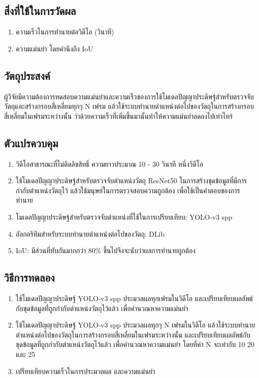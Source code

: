 \subsection*{สิ่งที่ใช้ในการวัดผล}
	\begin{enumerate}
		\setlength\itemsep{-0.25em}
		\item ความเร็วในการทำนายต่อวิดีโอ (วินาที)
		\item ความแม่นยำ โดยคำนึงถึง IoU
	\end{enumerate}
\subsection*{วัตถุประสงค์}
ผู้วิจัยมีความต้องการทดสอบความแม่นยำและความเร็วของการใช้โมเดลปัญญาประดิษฐ์สำหรับตรวจจับวัตถุและสร้างกรอบสี่เหลี่ยมทุกๆ N เฟรม 
แล้วใช้ระบบทำนายตำแหน่งต่อไปของวัตถุในการสร้างกรอบสี่เหลี่ยมในเฟรมระหว่างนั้น ว่าด้วยความเร็วที่เพิ่มขึ้นมานั้นทำให้ความแม่นยำลดลงไปเท่าไหร่
\subsection*{ตัวแปรควบคุม}
	\begin{enumerate}
		\setlength\itemsep{-0.25em}
		\item วิดีโอสาธารณะที่ไม่ติดลิขสิทธิ์ ความยาวประมาณ 10 - 30 วินาที หนึ่งวิดีโอ
		\item ใช้โมเดลปัญญาประดิษฐ์สำหรับตรวจจับตำแหน่งวัตถุ ResNet50 ในการสร้างชุดข้อมูลที่มีการกำกับตำแหน่งวัตถุไว้ แล้วใช้มนุษย์ในการตรวจสอบความถูกต้อง
		เพื่อใช้เป็นคำตอบของการทำนาย
		\item โมเดลปัญญาประดิษฐ์สำหรับตรวจจับตำแหน่งที่ใช้ในการเปรียบเทียบ: YOLO-v3 spp
		\item อัลกอริทึมสำหรับระบบทำนายตำแหน่งต่อไปของวัตถุ: DLib
		\item IoU: มีส่วนที่ทับกันมากกว่า 80\% ขึ้นไปจึงจะนับว่าผลการทำนายถูกต้อง
	\end{enumerate}
\subsection*{วิธีการทดลอง}
	\begin{enumerate}
		\setlength\itemsep{-0.25em}
		\item ใช้โมเดลปัญญาประดิษฐ์ YOLO-v3 spp ประมวลผลทุกเฟรมในวิดีโอ และเปรียบเทียบผลลัพธ์กับชุดข้อมูลที่ถูกกำกับตำแหน่งวัตถุไว้แล้ว เพื่อคำนวณหาความแม่นยำ
		\item ใช้โมเดลปัญญาประดิษฐ์ YOLO-v3 spp ประมวลผลทุกๆ N เฟรมในวิดีโอ แล้วใช้ระบบทำนายตำแหน่งต่อไปของวัตถุในการสร้างกรอบสี่เหลี่ยมในเฟรมระหว่างนั้น 
		และเปรียบเทียบผลลัพธ์กับชุดข้อมูลที่ถูกกำกับตำแหน่งวัตถุไว้แล้ว เพื่อคำนวณหาความแม่นยำ โดยที่ค่า N จะเท่ากับ 10 20 และ 25
		\item เปรียบเทียบความเร็วในการประมวลผล และความแม่นยำ
\end{enumerate}